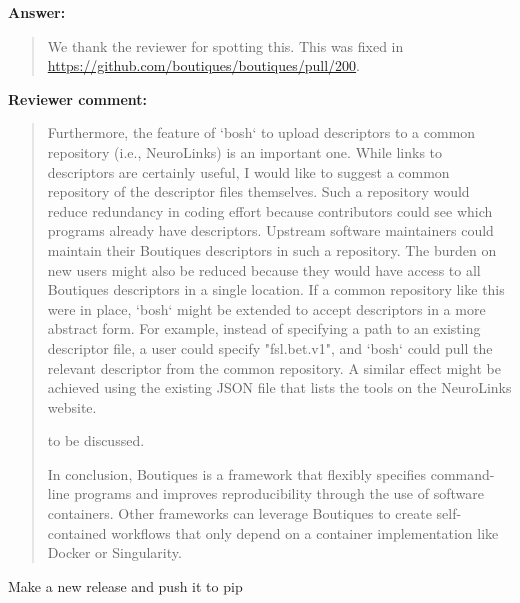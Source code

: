 \documentclass[a4]{article}
\newenvironment{review}%
{\textbf{Reviewer comment:}\begin{quote}}%
{\end{quote}}%
\newenvironment{answer}%
{\textbf{Answer:}\begin{small}\begin{quote}}%
{\end{quote}\end{small}}%
\newcommand{\todo}[1]{\color{red}#1\color{black}}
\begin{document}
\begin{answer}
  We thank the reviewer for spotting this. This was fixed in
  \url{https://github.com/boutiques/boutiques/pull/200}.
\end{answer}

\begin{review}
Furthermore, the feature of `bosh` to upload descriptors to a common repository (i.e., NeuroLinks) is an important one. While links to descriptors are certainly useful, I would like to suggest a common repository of the descriptor files themselves. Such a repository would reduce redundancy in coding effort because contributors could see which programs already have descriptors. Upstream software maintainers could maintain their Boutiques descriptors in such a repository. The burden on new users might also be reduced because they would have access to all Boutiques descriptors in a single location. If a common repository like this were in place, `bosh` might be extended to accept descriptors in a more abstract form. For example, instead of specifying a path to an existing descriptor file, a user could specify "fsl.bet.v1", and `bosh` could pull the relevant descriptor from the common repository. A similar effect might be achieved using the existing JSON file that lists the
tools on the NeuroLinks website.

\todo{to be discussed.}

In conclusion, Boutiques is a framework that flexibly specifies command-line programs and improves reproducibility through the use of software containers. Other frameworks can leverage Boutiques to create self-contained workflows that only depend on a container implementation like Docker or Singularity.
\end{review}

\todo{Make a new release and push it to pip}
\end{document}
